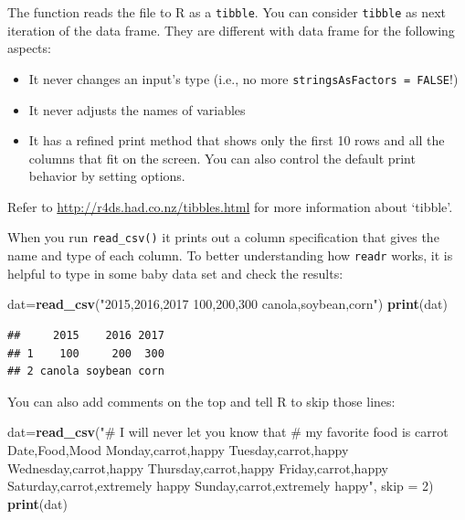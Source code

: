 \documentclass[]{book}
\newenvironment{Shaded}{\begin{snugshade}}{\end{snugshade}}
\newcommand{\KeywordTok}[1]{\textcolor[rgb]{0.13,0.29,0.53}{\textbf{{#1}}}}
\newcommand{\DataTypeTok}[1]{\textcolor[rgb]{0.13,0.29,0.53}{{#1}}}
\newcommand{\DecValTok}[1]{\textcolor[rgb]{0.00,0.00,0.81}{{#1}}}
\newcommand{\StringTok}[1]{\textcolor[rgb]{0.31,0.60,0.02}{{#1}}}
\newcommand{\NormalTok}[1]{{#1}}
\providecommand{\tightlist}{%
  \setlength{\itemsep}{0pt}\setlength{\parskip}{0pt}}
\theoremstyle{definition}
\theoremstyle{definition}
\theoremstyle{remark}
\begin{document}
The function reads the file to R as a \texttt{tibble}. You can consider
\texttt{tibble} as next iteration of the data frame. They are different
with data frame for the following aspects:

\begin{itemize}
\tightlist
\item
  It never changes an input's type (i.e., no more
  \texttt{stringsAsFactors\ =\ FALSE}!)
\item
  It never adjusts the names of variables
\item
  It has a refined print method that shows only the first 10 rows and
  all the columns that fit on the screen. You can also control the
  default print behavior by setting options.
\end{itemize}

Refer to \url{http://r4ds.had.co.nz/tibbles.html} for more information
about `tibble'.

When you run \texttt{read\_csv()} it prints out a column specification
that gives the name and type of each column. To better understanding how
\texttt{readr} works, it is helpful to type in some baby data set and
check the results:

\begin{Shaded}
\begin{Highlighting}[]
\NormalTok{dat=}\KeywordTok{read_csv}\NormalTok{(}\StringTok{"2015,2016,2017}
\StringTok{100,200,300}
\StringTok{canola,soybean,corn"}\NormalTok{)}
\KeywordTok{print}\NormalTok{(dat)}
\end{Highlighting}
\end{Shaded}

\begin{verbatim}
##     2015    2016 2017
## 1    100     200  300
## 2 canola soybean corn
\end{verbatim}

You can also add comments on the top and tell R to skip those lines:

\begin{Shaded}
\begin{Highlighting}[]
\NormalTok{dat=}\KeywordTok{read_csv}\NormalTok{(}\StringTok{"# I will never let you know that}
\StringTok{          # my favorite food is carrot}
\StringTok{          Date,Food,Mood}
\StringTok{          Monday,carrot,happy}
\StringTok{          Tuesday,carrot,happy}
\StringTok{          Wednesday,carrot,happy}
\StringTok{          Thursday,carrot,happy}
\StringTok{          Friday,carrot,happy}
\StringTok{          Saturday,carrot,extremely happy}
\StringTok{          Sunday,carrot,extremely happy"}\NormalTok{, }\DataTypeTok{skip =} \DecValTok{2}\NormalTok{)}
\KeywordTok{print}\NormalTok{(dat)}
\end{Highlighting}
\end{Shaded}
\end{document}
